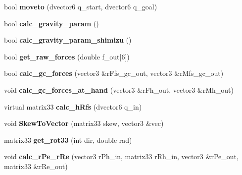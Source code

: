 \begin{DoxyCompactItemize}
\item 
\hypertarget{classhiroArm_a622b43c617ed85535a64554da180656a}{bool {\bfseries moveto} (dvector6 q\-\_\-start, dvector6 q\-\_\-goal)}\label{classhiroArm_a622b43c617ed85535a64554da180656a}

\item 
\hypertarget{classhiroArm_a1c2bbb832e890edf23688c71ed8c82e5}{bool {\bfseries calc\-\_\-gravity\-\_\-param} ()}\label{classhiroArm_a1c2bbb832e890edf23688c71ed8c82e5}

\item 
\hypertarget{classhiroArm_af221fa96d8de9e91509968d662187b30}{bool {\bfseries calc\-\_\-gravity\-\_\-param\-\_\-shimizu} ()}\label{classhiroArm_af221fa96d8de9e91509968d662187b30}

\item 
\hypertarget{classhiroArm_aa035fbbcf375297b8f6b9b8aab3b3449}{bool {\bfseries get\-\_\-raw\-\_\-forces} (double f\-\_\-out\mbox{[}6\mbox{]})}\label{classhiroArm_aa035fbbcf375297b8f6b9b8aab3b3449}

\item 
\hypertarget{classhiroArm_a2a162f14cb921ab87dec1fcf232c940f}{bool {\bfseries calc\-\_\-gc\-\_\-forces} (vector3 \&r\-Ffs\-\_\-gc\-\_\-out, vector3 \&r\-Mfs\-\_\-gc\-\_\-out)}\label{classhiroArm_a2a162f14cb921ab87dec1fcf232c940f}

\item 
\hypertarget{classhiroArm_a8ac00b1425ab54695392faa680041afb}{void {\bfseries calc\-\_\-gc\-\_\-forces\-\_\-at\-\_\-hand} (vector3 \&r\-Fh\-\_\-out, vector3 \&r\-Mh\-\_\-out)}\label{classhiroArm_a8ac00b1425ab54695392faa680041afb}

\item 
\hypertarget{classhiroArm_a6cd28378febc58968e53df0eed7deb35}{virtual matrix33 {\bfseries calc\-\_\-h\-Rfs} (dvector6 q\-\_\-in)}\label{classhiroArm_a6cd28378febc58968e53df0eed7deb35}

\item 
\hypertarget{classhiroArm_a5347280b572117eb0cd107e75df719e6}{void {\bfseries Skew\-To\-Vector} (matrix33 skew, vector3 \&vec)}\label{classhiroArm_a5347280b572117eb0cd107e75df719e6}

\item 
\hypertarget{classhiroArm_a67ebada1070014e309c3adc5953598f5}{matrix33 {\bfseries get\-\_\-rot33} (int dir, double rad)}\label{classhiroArm_a67ebada1070014e309c3adc5953598f5}

\item 
\hypertarget{classhiroArm_a234918c695614fa407e93597f6c6f4ee}{void {\bfseries calc\-\_\-r\-Pe\-\_\-r\-Re} (vector3 r\-Ph\-\_\-in, matrix33 r\-Rh\-\_\-in, vector3 \&r\-Pe\-\_\-out, matrix33 \&r\-Re\-\_\-out)}\label{classhiroArm_a234918c695614fa407e93597f6c6f4ee}

\end{DoxyCompactItemize}
